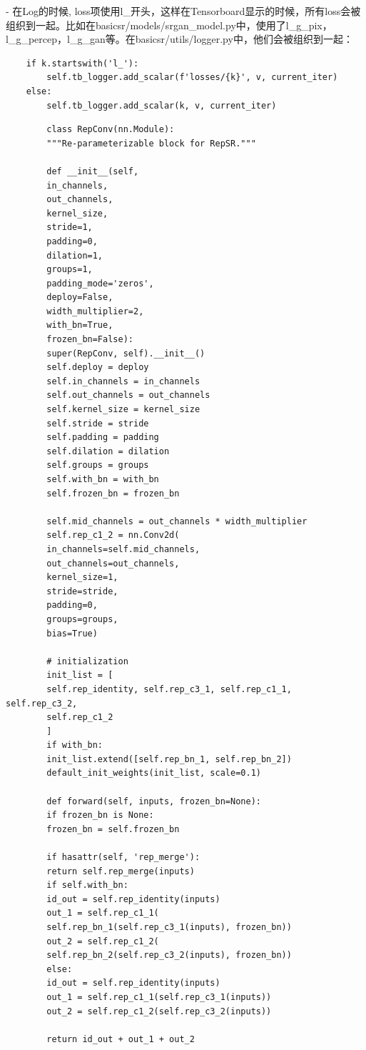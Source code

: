 \documentclass[../main.tex]{subfiles}
\begin{document}
    - 在Log的时候, loss项使用l\_开头，这样在Tensorboard显示的时候，所有loss会被组织到一起。比如在basicsr/models/srgan\_model.py中，使用了l\_g\_pix，l\_g\_percep，l\_g\_gan等。在basicsr/utils/logger.py中，他们会被组织到一起：
    \begin{verbatim}
    if k.startswith('l_'):
        self.tb_logger.add_scalar(f'losses/{k}', v, current_iter)
    else:
        self.tb_logger.add_scalar(k, v, current_iter)
	\end{verbatim}

	
	\begin{verbatim}
		class RepConv(nn.Module):
		"""Re-parameterizable block for RepSR."""
		
		def __init__(self,
		in_channels,
		out_channels,
		kernel_size,
		stride=1,
		padding=0,
		dilation=1,
		groups=1,
		padding_mode='zeros',
		deploy=False,
		width_multiplier=2,
		with_bn=True,
		frozen_bn=False):
		super(RepConv, self).__init__()
		self.deploy = deploy
		self.in_channels = in_channels
		self.out_channels = out_channels
		self.kernel_size = kernel_size
		self.stride = stride
		self.padding = padding
		self.dilation = dilation
		self.groups = groups
		self.with_bn = with_bn
		self.frozen_bn = frozen_bn
		
		self.mid_channels = out_channels * width_multiplier
		self.rep_c1_2 = nn.Conv2d(
		in_channels=self.mid_channels,
		out_channels=out_channels,
		kernel_size=1,
		stride=stride,
		padding=0,
		groups=groups,
		bias=True)
		
		# initialization
		init_list = [
		self.rep_identity, self.rep_c3_1, self.rep_c1_1, self.rep_c3_2,
		self.rep_c1_2
		]
		if with_bn:
		init_list.extend([self.rep_bn_1, self.rep_bn_2])
		default_init_weights(init_list, scale=0.1)
		
		def forward(self, inputs, frozen_bn=None):
		if frozen_bn is None:
		frozen_bn = self.frozen_bn
		
		if hasattr(self, 'rep_merge'):
		return self.rep_merge(inputs)
		if self.with_bn:
		id_out = self.rep_identity(inputs)
		out_1 = self.rep_c1_1(
		self.rep_bn_1(self.rep_c3_1(inputs), frozen_bn))
		out_2 = self.rep_c1_2(
		self.rep_bn_2(self.rep_c3_2(inputs), frozen_bn))
		else:
		id_out = self.rep_identity(inputs)
		out_1 = self.rep_c1_1(self.rep_c3_1(inputs))
		out_2 = self.rep_c1_2(self.rep_c3_2(inputs))
		
		return id_out + out_1 + out_2
	\end{verbatim}
	
\end{document}
